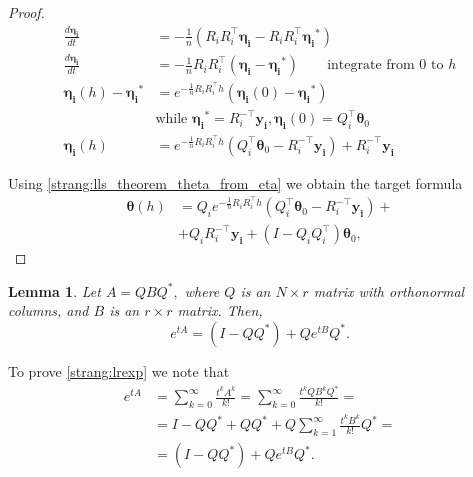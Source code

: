 \documentclass{article}
\newtheorem{lemma}{Lemma}
\newcommand{\vect}[1]{\boldsymbol{\mathbf{#1}}}
\begin{document}
\begin{proof}
\begin{align*}
\frac{d \vect{\eta_i}}{d t} &= - \frac{1}{n} \left( R_iR_i^\top \vect{\eta_i}- R_iR_i^\top \vect{\eta_i}^*\right) \\
\frac{d \vect{\eta_i}}{d t} &= - \frac{1}{n} R_iR_i^\top \left( \vect{\eta_i}- \vect{\eta_i}^*\right) \qquad \text{integrate from $0$ to $h$} \\
\vect{\eta_i}(h) - \vect{\eta_i}^* &= e^{- \frac{1}{n} R_iR_i^\top h} (\vect{\eta_i}(0) - \vect{\eta_i}^*) \\ 
&\text{while } \vect{\eta_i}^* = R_i^{-\top}\vect{y_i}, \vect{\eta_i}(0) = Q_i^\top \vect{\theta}_0 \\
\vect{\eta_i}(h) &= e^{- \frac{1}{n} R_iR_i^\top h} (Q_i^\top \vect{\theta}_0 - R_i^{-\top}\vect{y_i}) + R_i^{-\top}\vect{y_i} 
\end{align*}

Using \eqref{strang:lls_theorem_theta_from_eta} we obtain the target formula
\begin{equation*}
\begin{split}
\vect{\theta}(h) &= Q_i e^{-\frac{1}{n}R_iR_i^\top h} \left( Q_i^\top \vect{\theta}_0 - R_i^{-\top}\vect{y_i}\right) + \\ &+ Q_iR_i^{-\top}\vect{y_i} + (I - Q_iQ_i^\top)\vect{\theta}_0,
\end{split}
\end{equation*}

\end{proof}

\begin{lemma}\label{strang:lemexp}
Let $A = Q B Q^*,$ where $Q$ is an $N \times r$ matrix with orthonormal columns, and $B$ is an $r \times r$ matrix. Then,
\begin{equation}\label{strang:lrexp}
    e^{t A}  = (I - QQ^*) + Q e^{t B} Q^*.
\end{equation}
\end{lemma}
To prove \eqref{strang:lrexp} we note that
\begin{equation*}
\begin{split}
e^{t A} &= \sum_{k=0}^{\infty} \frac{t^k A^k}{k!} = \sum_{k=0}^{\infty} \frac{t^k Q B^k Q^*}{k!} = \\ &= I - QQ^* + QQ^* + Q \sum_{k=1}^{\infty} \frac{t^k B^k}{k!} Q^* = \\ &= (I - QQ^*) + Q e^{t B} Q^*.
\end{split}
\end{equation*}
\end{document}
